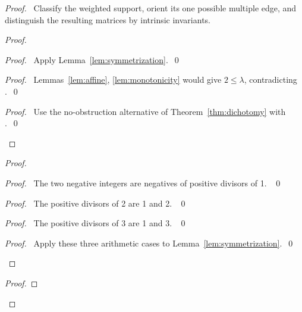 \begin{proof}
\pfsketch\ Classify the weighted support, orient its one possible multiple
edge, and distinguish the resulting matrices by intrinsic invariants.
\begin{proof}
\begin{proof}\pf\ Apply Lemma~\ref{lem:symmetrization}.~\qed\end{proof}
\begin{proof}\pf\ Lemmas~\ref{lem:affine}, \ref{lem:monotonicity}
would give $2\leq\lambda$, contradicting .~\qed\end{proof}
\qedstep
\begin{proof}\pf\ Use the no-obstruction alternative of
Theorem~\ref{thm:dichotomy} with .~\qed\end{proof}
\end{proof}
\begin{proof}
\begin{proof}\pf\ The two negative integers are negatives of positive
divisors of 1. ~\qed\end{proof}
\begin{proof}\pf\ The positive divisors of 2 are 1 and 2. ~\qed\end{proof}
\begin{proof}\pf\ The positive divisors of 3 are 1 and 3. ~\qed\end{proof}
\qedstep
\begin{proof}\pf\ Apply these three arithmetic cases to
Lemma~\ref{lem:symmetrization}.~\qed\end{proof}
\end{proof}
\begin{proof}

\end{proof}
\end{proof}
